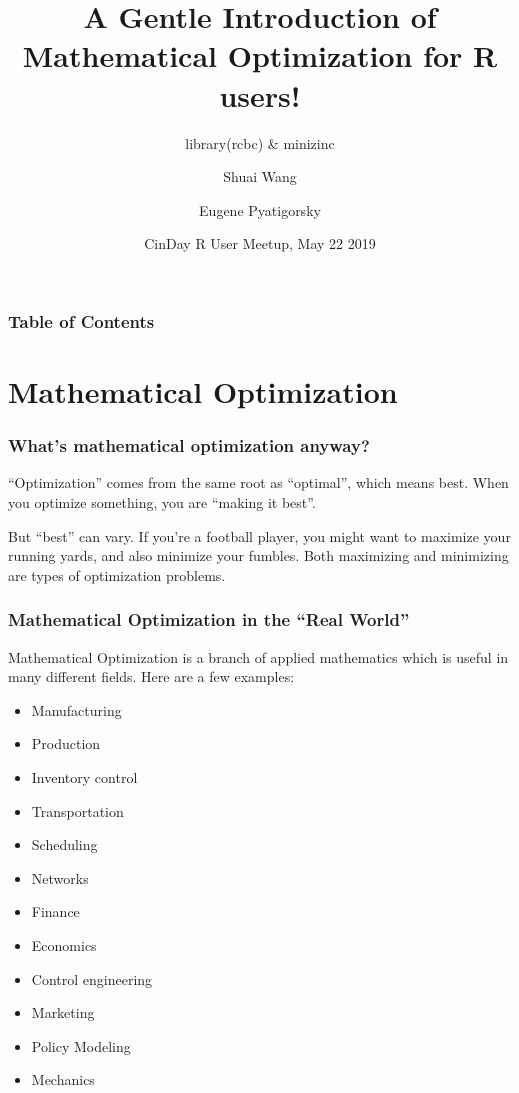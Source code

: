 \documentclass[xcolor=dvipsnames,aspectratio=169]{beamer}
\title[]{A Gentle Introduction of Mathematical Optimization for R users!}
\subtitle{library(rcbc) \& minizinc}
\author[]{Shuai Wang \and Eugene Pyatigorsky}
\institute[] %
{84.51 Operations Research}
\date[] %
{CinDay R User Meetup, May 22 2019}
\begin{document}
\frame{\titlepage}


\begin{frame}
\frametitle{Table of Contents}
\tableofcontents
\end{frame}


\section{Mathematical Optimization}

\begin{frame}
\frametitle{What's mathematical optimization anyway?}
“Optimization” comes from the same root as “optimal”, which means best. When you
optimize something, you are “making it best”.


But “best” can vary. If you’re a football player, you might want to maximize your
running yards, and also minimize your fumbles. Both maximizing and minimizing are types
of optimization problems.
\end{frame}



\begin{frame}
\frametitle{Mathematical Optimization in the “Real World”}
Mathematical Optimization is a branch of applied mathematics which is useful in many different fields. Here are a few examples:
 \begin{multicols}{2}
    \begin{itemize}
        \item Manufacturing
        \item Production
        \item Inventory control
        \item Transportation
        \item Scheduling
        \item Networks
        \item Finance
        \item Economics
        \item Control engineering
        \item Marketing
        \item Policy Modeling
        \item Mechanics
    \end{itemize}
    \end{multicols}

\end{frame}
\end{document}
